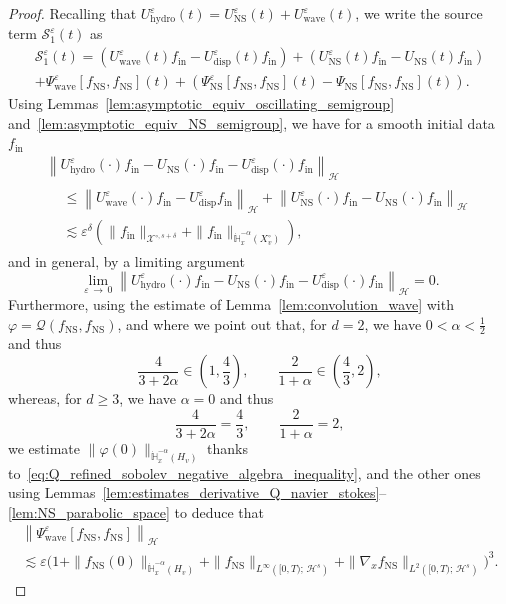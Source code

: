 \documentclass[AHL,Unicode,longabstracts,published]{cedram}
\newcommand{\ini}{\mathrm{in}}
\newcommand{\ns}{\mathrm{NS}}
\newcommand{\hyd}{\mathrm{hydro}}
\newcommand{\Wave}{\mathrm{wave}}
\newcommand{\disp}{\mathrm{disp}}
\newcommand{\bbH}{\mathbb{H}}
\newcommand{\XX}{\mathcal{X}}
\newcommand{\HH}{\mathcal{H}}
\newcommand{\QQ}{\mathcal{Q}}
\renewcommand{\SS}{\mathcal{S}}
\newcommand{\HHH}{\mathscr{H}}
\newcommand{\Ss}{H}
\newcommand{\rSSs}[1]{\HH^{#1}}
\newcommand{\SSSs}{\HHH}
\newcommand{\Slm}{X^{\circ}}
\newcommand{\rSSlm}[1]{\XX^{{\circ}, #1}}
\renewcommand*\le{\leqslant}
\renewcommand*\geq{\geqslant}
\newcommand*\eps{{\varepsilon}}
\begin{document}
\begin{proof}
Recalling that $U_\hyd^{\eps}(t)=U^{\eps}_{\ns}(t)+U_{\Wave}^{\eps}(t)$, we write the source term $\SS^\eps_1(t)$ as
\begin{multline*}
\SS^\eps_1(t) = \left(U^\eps_\Wave(t)f_{\ini} - U^\eps_\disp(t)f_{\ini}\right) + \left(U^\eps_\ns(t)f_{\ini} - U_\ns(t)f_{\ini}\right) \\
 + \Psi^\eps_\Wave\left[f_\ns, f_\ns\right](t) + \left(\Psi^\eps_\ns\left[f_\ns, f_\ns\right](t)- \Psi_\ns\left[f_\ns, f_\ns\right](t)\right).
\end{multline*}
Using Lemmas~\ref{lem:asymptotic_equiv_oscillating_semigroup} and~\ref{lem:asymptotic_equiv_NS_semigroup}, we have for a smooth initial data $f_\ini$
\begin{multline*}
\left\| U^\eps_\hyd(\cdot)f_\ini - U_\ns(\cdot)f_\ini - U^\eps_\disp(\cdot) f_\ini \right\|_\SSSs  \\
\begin{aligned}
 &\le \left\| U^\eps_\Wave(\cdot) f_\ini - U^\eps_\disp f_\ini \right\|_\SSSs + \left\| U^\eps_\ns(\cdot) f_\ini - U_\ns(\cdot) f_\ini \right\|_\SSSs \\
& \lesssim \eps^{\delta} \left(\| f_\ini \|_{\rSSlm{s+\delta}} + \| f_\ini \|_{ \dot{\bbH}^{-\alpha}_x \left(\Slm_v \right) } \right),
\end{aligned}
\end{multline*}
and in general, by a limiting argument
\[
\lim_{\eps\,\to\,0}\left\| U^\eps_\hyd(\cdot)f_\ini - U_\ns(\cdot)f_\ini - U^\eps_\disp(\cdot) f_\ini \right\|_\SSSs=0.
\]
Furthermore, using the estimate of Lemma~\ref{lem:convolution_wave} with $\varphi = \QQ(f_\ns, f_\ns)$, and where we point out that, for $d=2$, we have $0 < \alpha < \frac{1}{2}$ and thus
\[
\frac{4}{3 + 2 \alpha} \in \left(1, \frac{4}{3}\right), \qquad \frac{2}{1+\alpha} \in \left(\frac{4}{3}, 2\right),
\]
whereas, for $d \geq3$, we have $\alpha=0$ and thus
\[
\frac{4}{3 + 2 \alpha} = \frac{4}{3}, \qquad \frac{2}{1+\alpha} = 2,
\]
we estimate $ \| \varphi(0) \|_{ \dot{\bbH}_x^{-\alpha}(\Ss_v )}$ thanks to~\eqref{eq:Q_refined_sobolev_negative_algebra_inequality}, and the other ones using Lemmas~\ref{lem:estimates_derivative_Q_navier_stokes}--\ref{lem:NS_parabolic_space} to deduce that
\begin{multline*}
\left\| \Psi^\eps_\Wave\left[f_\ns, f_\ns\right] \right\|_{\SSSs}\\
\lesssim \eps \Big(1 + \| f_\ns(0) \|_{ \dot{\bbH}^{-\alpha}_x \left(\Ss_v \right) } + \| f_\ns \|_{ L^\infty\left([0, T);\,\rSSs{s} \right) } + \| \nabla_x f_\ns \|_{ L^2\left([0, T);\,\rSSs{s} \right) }\Big)^3.

\end{multline*}
\end{proof}
\end{document}
